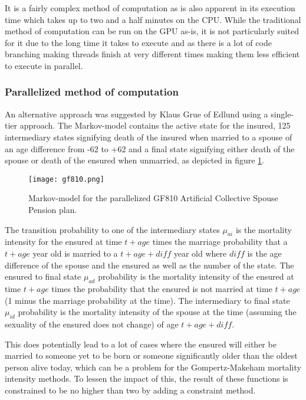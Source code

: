 It is a fairly complex method of computation as is also apparent in its execution time which takes up to two and a half minutes on the CPU.
While the traditional method of computation can be run on the GPU as-is, it is not particularly suited for it due to the long time it takes to execute and as there is a lot of code branching making threads finish at very different times making them less efficient to execute in parallel.

\subsubsection{Parallelized method of computation}\label{subsubsec:gf810parallelized}
An alternative approach was suggested by Klaus Grue of Edlund using a single-tier approach.
The Markov-model contains the active state for the insured, 125 intermediary states signifying death of the insured when married to a spouse of an age difference from -62 to +62 and a final state signifying either death of the spouse or death of the ensured when unmarried, as depicted in figure \ref{fig:gf810}.

\begin{figure}[h!]\centering
\texttt{[image: gf810.png]}
\caption{Markov-model for the parallelized GF810 Artificial Collective Spouse Pension plan.\label{fig:gf810}}
\end{figure}

The transition probability to one of the intermediary states $\mu_{ai}$ is the mortality intensity for the ensured at time $t + age$ times the marriage probability that a $t + age$ year old is married to a $t + age + diff$ year old where $diff$ is the age difference of the spouse and the ensured as well as the number of the state.
The ensured to final state $\mu_{ad}$ probability is the mortality intensity of the ensured at time $t + age$ times the probability that the ensured is not married at time $t + age$ (1 minus the marriage probability at the time).
The intermediary to final state $\mu_{id}$ probability is the mortality intensity of the spouse at the time (assuming the sexuality of the ensured does not change) of age $t + age + diff$.

This does potentially lead to a lot of cases where the ensured will either be married to someone yet to be born or someone significantly older than the oldest person alive today, which can be a problem for the Gompertz-Makeham mortality intensity methods.
To lessen the impact of this, the result of these functions is constrained to be no higher than two by adding a constraint method.

